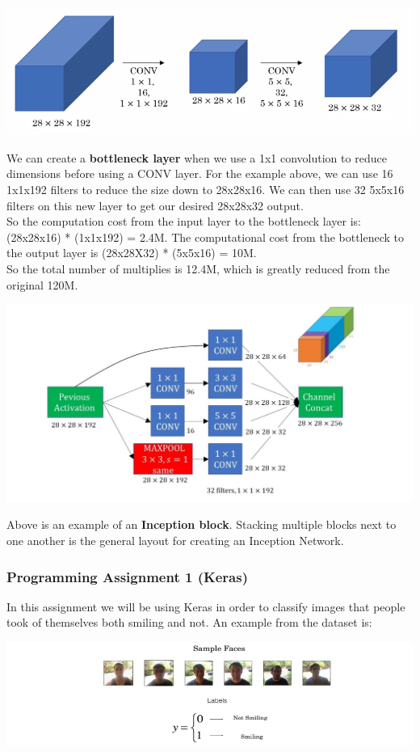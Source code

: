\documentclass[11pt, a4paper]{article}
\begin{document}
\begin{spacing}{1.1}
	\begin{center}	\includegraphics[scale=.57]{bottleneck}	\end{center}
	We can create a \textbf{bottleneck layer} when we use a 1x1 convolution to reduce dimensions before using a CONV layer. For the example above, we can use 16 1x1x192 filters to reduce the size down to 28x28x16. We can then use 32 5x5x16 filters on this new layer to get our desired 28x28x32 output. \vspace*{1mm}\\
	So the computation cost from the input layer to the bottleneck layer is: (28x28x16) * (1x1x192) = 2.4M. The computational cost from the bottleneck to the output layer is (28x28X32) * (5x5x16) = 10M.\\ So the total number of multiplies is 12.4M, which is greatly reduced from the original 120M. \\
	\begin{center}	\includegraphics[scale=.4]{incept_mod}	\end{center}
	Above is an example of an \textbf{Inception block}. Stacking multiple blocks next to one another is the general layout for creating an Inception Network. \\
	
	\subsubsection{Programming Assignment 1 (Keras)}
	In this assignment we will be using Keras in order to classify images that people took of themselves both smiling and not. An example from the dataset is:
	\begin{center}	\includegraphics[scale=.7]{keras_tut}	\end{center} \newpage


\end{spacing}
\end{document}
